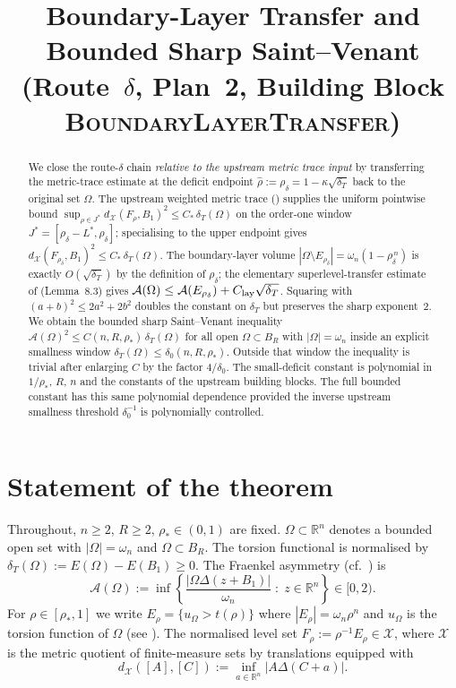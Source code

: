 \documentclass[11pt]{article}
\title{Boundary-Layer Transfer and Bounded Sharp Saint--Venant\\
       (Route~$\delta$, Plan~2, Building Block \textsc{BoundaryLayerTransfer})}
\author{}
\date{}
\theoremstyle{definition}
\newcommand{\R}{\mathbb{R}}
\newcommand{\Fr}{\mathcal{A}}
\newcommand{\Om}{\Omega}
\newcommand{\rstar}{\rho_{*}}
\newcommand{\rhad}{\widehat\rho}
\newcommand{\X}{\mathcal X}
\begin{document}
\maketitle

\begin{abstract}
We close the route-$\delta$ chain \emph{relative to the upstream metric
trace input} by transferring the metric-trace estimate at the deficit
endpoint $\rhad:=\rho_\delta=1-\kappa\sqrt{\delta_T}$ back to the
original set $\Om$.
The upstream weighted metric trace (\cite{WeightedMetricTrace}) supplies
the uniform pointwise bound
$\sup_{\rho\in J^*}d_{\X}(F_\rho,B_1)^2\le C_*\,\delta_T(\Om)$ on the
order-one window $J^*=[\rho_\delta-L^*,\rho_\delta]$; specialising to
the upper endpoint gives $d_{\X}(F_{\rho_\delta},B_1)^2\le C_*\,\delta_T(\Om)$.
The boundary-layer volume
$|\Om\setminus E_{\rho_\delta}|=\omega_n(1-\rho_\delta^{\,n})$ is exactly
$O(\sqrt{\delta_T})$ by the definition of $\rho_\delta$; the elementary
superlevel-transfer estimate of \cite{LevelSetIdentity} (Lemma~8.3)
gives $\Fr(\Om)\le \Fr(E_{\rho_\delta})+C_{\rm lay}\sqrt{\delta_T}$.
Squaring
with $(a+b)^2\le 2a^2+2b^2$ doubles the constant on $\delta_T$ but
preserves the sharp exponent~$2$. We obtain the bounded sharp
Saint--Venant inequality
$\Fr(\Om)^2\le C(n,R,\rstar)\,\delta_T(\Om)$ for all open
$\Om\subset B_R$ with $|\Om|=\omega_n$ inside an explicit smallness
window $\delta_T(\Om)\le \delta_0(n,R,\rstar)$. Outside that window
the inequality is trivial after enlarging $C$ by the factor
$4/\delta_0$. The small-deficit constant is polynomial in
$1/\rstar$, $R$, $n$ and the constants of the upstream building
blocks. The full bounded constant has this same polynomial dependence
provided the inverse upstream smallness threshold $\delta_0^{-1}$ is
polynomially controlled.
\end{abstract}

\section{Statement of the theorem}\label{sec:statement}

Throughout, $n\ge 2$, $R\ge 2$, $\rstar\in(0,1)$ are fixed.
$\Om\subset\R^n$ denotes a bounded open set with $|\Om|=\omega_n$ and
$\Om\subset B_R$. The torsion functional is normalised by
$\delta_T(\Om):=E(\Om)-E(B_1)\ge 0$.
The Fraenkel asymmetry (cf.\ \cite{AFP2000}) is
\[
\Fr(\Om):=\inf\!\left\{\frac{|\Om\Delta(z+B_1)|}{\omega_n}\;:\;z\in\R^n\right\}\in[0,2).
\]
For $\rho\in[\rstar,1]$ we write $E_\rho=\{u_\Om>t(\rho)\}$ where
$|E_\rho|=\omega_n\rho^n$ and $u_\Om$ is the torsion function of $\Om$
(see \cite{LevelSetIdentity}). The normalised level set
$F_\rho:=\rho^{-1}E_\rho\in\X$, where $\X$ is the metric quotient of
finite-measure sets by translations equipped with
\[
d_{\X}([A],[C]):=\inf_{a\in\R^n}|A\Delta(C+a)|.
\]
\end{document}
